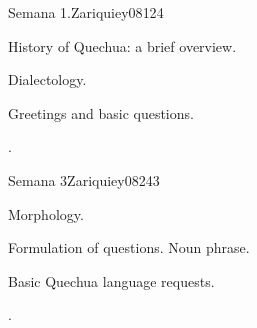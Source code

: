 \begin{syllabus}
\begin{competences}
    \item {}
\end{competences}

\begin{unit}{}{Semana 1.}{Zariquiey08}{12}{4}
   \begin{topics}
      \item History of Quechua: a brief overview.
      \item Dialectology.
      \item Greetings and basic questions.
   \end{topics}

   \begin{learningoutcomes}
      \item .
   \end{learningoutcomes}
\end{unit}


\begin{unit}{}{Semana 3}{Zariquiey08}{24}{3}
   \begin{topics}
      \item Morphology.
      \item Formulation of questions. Noun phrase.
      \item Basic Quechua language requests.
   \end{topics}

   \begin{learningoutcomes}
      \item .
     
   \end{learningoutcomes}
\end{unit}


\end{syllabus}
